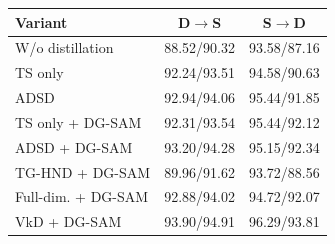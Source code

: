 \par\medskip\noindent\begin{minipage}{\columnwidth}
\captionsetup{type=table}
\centering
\caption{Stage II University-1652 results. Cells report R@1/AP (\%).}
\label{tab:supp-student-university}
{\footnotesize\setlength{\tabcolsep}{2pt}\renewcommand{\arraystretch}{1.08}
\begin{tabular*}{\columnwidth}{@{\extracolsep{\fill}}lcc@{}}
\toprule
Variant & D$\rightarrow$S & S$\rightarrow$D \\
\midrule
W/o distillation & 88.52/90.32 & 93.58/87.16 \\
TS only & 92.24/93.51 & 94.58/90.63 \\
ADSD & 92.94/94.06 & 95.44/91.85 \\
TS only + DG-SAM & 92.31/93.54 & 95.44/92.12 \\
ADSD + DG-SAM & 93.20/94.28 & 95.15/92.34 \\
TG-HND + DG-SAM & 89.96/91.62 & 93.72/88.56 \\
Full-dim. + DG-SAM & 92.88/94.02 & 94.72/92.07 \\
VkD + DG-SAM & 93.90/94.91 & 96.29/93.81 \\
\bottomrule
\end{tabular*}}
\end{minipage}\par\medskip
\par\medskip\noindent\begin{minipage}{\columnwidth}
\captionsetup{type=table}
\centering
\caption{Stage II GTA-UAV same-area results. R@1 and AP are percentages. Dis@1 is in meters.}
\label{tab:supp-student-gta}
{\footnotesize\setlength{\tabcolsep}{2pt}\renewcommand{\arraystretch}{1.08}
}
\end{minipage}\par\medskip
